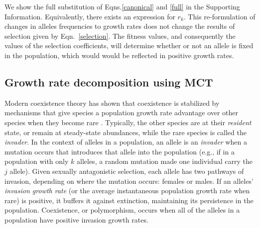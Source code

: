 \documentclass[12pt]{article}
\begin{document}


We show the full substitution of Eqns.\ref{canonical} and \ref{full} in the Supporting Information. Equivalently, there exists an expression for $r_{k}$. This re-formulation of changes in alleles frequencies to growth rates does not change the results of selection given by Eqn.~\ref{selection}. The fitness values, and consequently the values of the selection coefficients, will determine whether or not an allele is fixed in the population, which would would be reflected in positive growth rates.

\subsection*{Growth rate decomposition using MCT}

Modern coexistence theory has shown that coexistence is stabilized by mechanisms that give species a population growth rate advantage over other species when they become rare \citep{chesson_stabilizing_1982, chesson2003quantifying, barabas_chessons_2018}. Typically, the other species are at their \textit{resident} state, or remain at steady-state abundances, while the rare species is called the \textit{invader}. In the context of alleles in a population, an allele is an \textit{invader} when a mutation occurs that introduces that allele into the population (e.g., if in a population with only $k$ alleles, a random mutation made one individual carry the $j$ allele). Given sexually antagonistic selection, each allele has two pathways of invasion, depending on where the mutation occurs: females or males. If an alleles' \textit{invasion growth rate} (or the average instantaneous population growth rate when rare) is positive, it buffers it against extinction, maintaining its persistence in the population.  Coexistence, or polymorphism, occurs when all of the alleles in a population have positive invasion growth rates.
\end{document}
